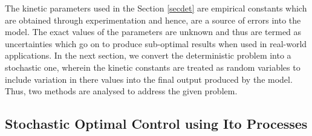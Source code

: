 \documentclass[3p,times,authoryear]{elsarticle}
\begin{document}
The kinetic parameters used in the Section \ref{secdet} are empirical constants which are obtained through experimentation and hence, are a source of errors into the model. The exact values of the parameters are unknown and thus are termed as uncertainties which go on to produce sub-optimal results when used in real-world applications. In the next section, we convert the deterministic problem into a stochastic one, wherein the kinetic constants are treated as random variables to include variation in there values into the final output produced by the model. Thus, two methods are analysed to address the given problem. 

\subsection{Stochastic Optimal Control using Ito Processes}
\end{document}
